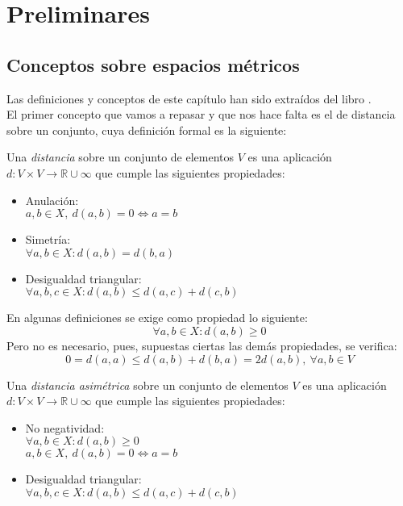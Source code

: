
\setchapterpreamble[c][0.75\linewidth]{%
	\sffamily
	\par\bigskip
}
\chapter{Preliminares}\label{ch:primer-capitulo}

\section{Conceptos sobre espacios métricos}
Las definiciones y conceptos de este capítulo han sido extraídos del libro \cite{topo}. \\

El primer concepto que vamos a repasar y que nos hace falta es el de distancia sobre un conjunto, cuya definición formal es la siguiente:

\begin{definicion}
	Una \textit{distancia} sobre un conjunto de elementos $V$ es una aplicación $d:V\times V\rightarrow \mathbb{R}\cup \infty$ que cumple las siguientes propiedades:
	\begin{itemize}
		\item Anulación:
		\\ \hspace*{1cm}$a,b \in X,\ d(a,b)=0\Leftrightarrow a=b$
		\item Simetría:
		\\ \hspace*{1cm}$\forall a,b \in X: d(a,b)=d(b,a)$
		\item Desigualdad triangular:
		\\ \hspace*{1cm}$\forall a,b,c \in X: d(a,b)\leq d(a,c)+d(c,b)$
	\end{itemize}
\end{definicion}

En algunas definiciones se exige como propiedad lo siguiente:
$$\forall a,b\in X:d(a,b) \geq 0$$
Pero no es necesario, pues, supuestas ciertas las demás propiedades, se verifica:
$$0=d(a,a)\leq d(a,b) + d(b,a) = 2d(a,b),\ \forall a,b\in V$$

\begin{definicion}
	Una \textit{distancia asimétrica} sobre un conjunto de elementos $V$ es una aplicación $d:V\times V\rightarrow \mathbb{R}\cup \infty$ que cumple las siguientes propiedades:
	\begin{itemize}
		\item No negatividad:
		\\ \hspace*{1cm}$\forall a,b\in X:d(a,b) \geq 0$
		\\ \hspace*{1cm}$a,b \in X,\ d(a,b)=0\Leftrightarrow a=b$
		\item Desigualdad triangular:
		\\ \hspace*{1cm}$\forall a,b,c \in X: d(a,b)\leq d(a,c)+d(c,b)$
	\end{itemize}
\end{definicion}

